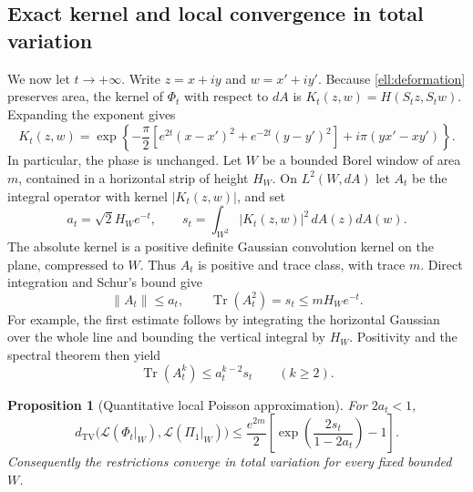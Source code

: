 \documentclass[11pt,a4paper]{article}
\newtheorem{proposition}[theorem]{Proposition}
\theoremstyle{definition}
\theoremstyle{remark}
\numberwithin{equation}{section}
\begin{document}
\subsection{Exact kernel and local convergence in total variation}

We now let $t\to+\infty$.  Write $z=x+iy$ and $w=x'+iy'$.
Because \eqref{ell:deformation} preserves area, the kernel of
$\Phi_t$ with respect to $dA$ is $K_t(z,w)=H(S_tz,S_tw)$.
Expanding the exponent gives
\begin{equation}\label{ell:anisotropic-kernel}
 K_t(z,w)=\exp\left\{
 -\frac\pi2\left[e^{2t}(x-x')^2+e^{-2t}(y-y')^2\right]
 +i\pi(yx'-xy')\right\}.
\end{equation}
In particular, the phase is unchanged.  Let $W$ be a bounded Borel
window of area $m$, contained in a horizontal strip of height $H_W$.
On $L^2(W,dA)$ let $A_t$ be the integral operator with kernel
$|K_t(z,w)|$, and set
\begin{equation}\label{ell:at-st}
 a_t=\sqrt2 H_W e^{-t},\qquad
 s_t=\int_{W^2}|K_t(z,w)|^2\,dA(z)dA(w).
\end{equation}
The absolute kernel is a positive definite Gaussian convolution
kernel on the plane, compressed to $W$.  Thus $A_t$ is positive
and trace class, with trace $m$.  Direct integration and Schur's
bound give
\begin{equation}\label{ell:operator-bounds}
 \|A_t\|\le a_t,\qquad
 \operatorname{Tr}(A_t^2)=s_t\le mH_W e^{-t}.
\end{equation}
For example, the first estimate follows by integrating the
horizontal Gaussian over the whole line and bounding the vertical
integral by $H_W$.  Positivity and the spectral theorem then yield
\begin{equation}\label{ell:cycle-trace}
 \operatorname{Tr}(A_t^k)\le a_t^{k-2}s_t\qquad(k\ge2).
\end{equation}

\begin{proposition}[Quantitative local Poisson approximation]
\label{ell:tv}
For $2a_t<1$,
\begin{equation}\label{ell:tv-bound}
 d_{\mathrm{TV}}\bigl(\mathcal L(\Phi_t|_W),
                    \mathcal L(\Pi_1|_W)\bigr)
 \le\frac{e^{2m}}2
  \left[\exp\left(\frac{2s_t}{1-2a_t}\right)-1\right].
\end{equation}
Consequently the restrictions converge in total variation for
every fixed bounded $W$.
\end{proposition}
\end{document}
